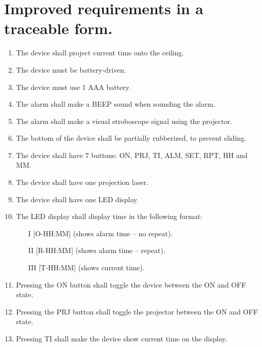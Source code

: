 \documentclass[Main_Assignment2]{subfiles}
\begin{document}
\section{Improved requirements in a traceable form.}

\begin{enumerate}[label=RE\arabic*:]
	\item 
	The device shall project current time onto the ceiling.
	
	\item 
	The device must be battery-driven.

	\item
	The device must use 1 AAA battery.

	\item
	The alarm shall make a BEEP sound when sounding the alarm.

	\item 
	The alarm shall make a visual stroboscope signal using the projector.

	\item
	The bottom of the device shall be partially rubberized, to prevent sliding.

	\item
	The device shall have 7 buttons: ON, PRJ, TI, ALM, SET, RPT, HH and MM.

	\item
	The device shall have one projection laser.

	\item
	The device shall have one LED display.

	\item
	The LED display shall display time in the following format:

	\begin{itemize}
		\item [I] [O-HH:MM] (shows alarm time – no repeat).
		\item [II] [R-HH:MM] (shows alarm time – repeat).
		\item [III] [T-HH:MM] (shows current time).

	\end{itemize}

	\item
	Pressing the ON button shall toggle the device between the ON and OFF state.

	\item
	Pressing the PRJ button shall toggle the projector between the ON and OFF state.	

	\item
	Pressing TI shall make the device show current time on the display.


\end{enumerate}
\end{document}
